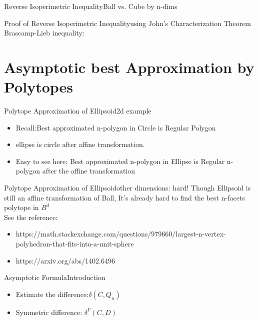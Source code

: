 \documentclass[
  english,            %
  aspectratio=169,    %
]{tumbeamer}
\begin{document}
\begin{frame}{Reverse Isoperimetric Inequality}{Ball vs. Cube by n-dims}

\end{frame}

\begin{frame}{Proof of Reverse Isoperimetric Inequality}{using John's Characterization Theorem}
Brascamp-Lieb inequality:

\end{frame}

\section{Asymptotic best Approximation by Polytopes}
\begin{frame}{Polytope Approximation of Ellipsoid}{2d example}
  \begin{itemize}
    \item Recall:Best approximated n-polygon in Circle is Regular Polygon 
    \item ellipse is circle after affine transformation.
    \item Easy to see here: Best approximated n-polygon in Ellipse is Regular n-polygon after the affine transformation
  \end{itemize}
\end{frame}

\begin{frame}{Polytope Approximation of Ellipsoid}{other dimensions: hard!}
 Though Ellipsoid is still an affine transformation of Ball, It's already hard to find the best n-facets polytope in $B^{d}$
 \\
 See the reference:
  \begin{itemize}
     \item https://math.stackexchange.com/questions/979660/largest-n-vertex-polyhedron-that-fits-into-a-unit-sphere
     \item https://arxiv.org/abs/1402.6496
  \end{itemize}
\end{frame}


\begin{frame}{Asymptotic Formula}{Introduction}
    \begin{itemize}
        \item Estimate the difference:$\delta(C,Q_{n})$
        \item Symmetric difference: $\delta^{V}(C,D)$
    \end{itemize}
\end{frame}
\end{document}
